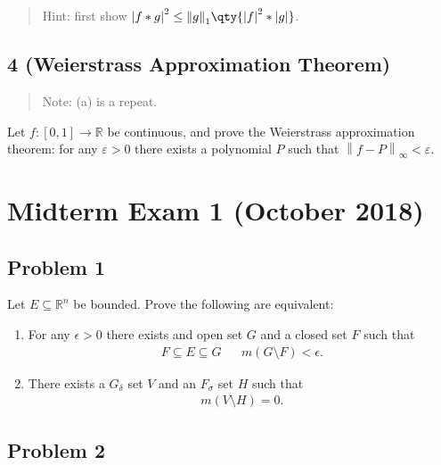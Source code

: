 \begin{quote}
Hint: first show
\({\left\lvert {f\ast g} \right\rvert}^2 \leq {\left\lVert {g} \right\rVert}_1 \qty{ {\left\lvert {f} \right\rvert}^2 \ast {\left\lvert {g} \right\rvert}}\).
\end{quote}

\hypertarget{weierstrass-approximation-theorem}{%
\subsection{4 (Weierstrass Approximation
Theorem)}\label{weierstrass-approximation-theorem}}

\begin{quote}
Note: (a) is a repeat.
\end{quote}

Let \(f: [0, 1]\to {\mathbb{R}}\) be continuous, and prove the
Weierstrass approximation theorem: for any \(\varepsilon> 0\) there
exists a polynomial \(P\) such that
\({\left\lVert {f - P} \right\rVert}_{\infty} < \varepsilon\).

\hypertarget{midterm-exam-1-october-2018}{%
\section{Midterm Exam 1 (October
2018)}\label{midterm-exam-1-october-2018}}

\hypertarget{problem-1}{%
\subsection{Problem 1}\label{problem-1}}

Let \(E \subseteq {\mathbb{R}}^n\) be bounded. Prove the following are
equivalent:

\begin{enumerate}
\def\labelenumi{\arabic{enumi}.}
\item
  For any \(\epsilon>0\) there exists and open set \(G\) and a closed
  set \(F\) such that
  \begin{align*}
  F \subseteq E \subseteq G && m(G\setminus F) < \epsilon
  .\end{align*}
\item
  There exists a \(G_ \delta\) set \(V\) and an \(F_ \sigma\) set \(H\)
  such that
  \begin{align*}
  m(V\setminus H) = 0
  .\end{align*}
\end{enumerate}

\hypertarget{problem-2}{%
\subsection{Problem 2}\label{problem-2}}

